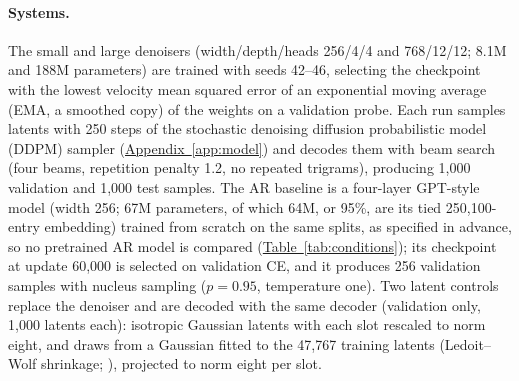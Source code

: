 \documentclass[11pt,a4paper]{article}
\begin{document}
\paragraph{Systems.} The small and large denoisers (width/depth/heads 256/4/4 and 768/12/12; 8.1M and 188M parameters) are trained with seeds 42--46, selecting the checkpoint with the lowest velocity mean squared error of an exponential moving average (EMA, a smoothed copy) of the weights on a validation probe. Each run samples latents with 250 steps of the stochastic denoising diffusion probabilistic model (DDPM) sampler \citep{ho2020denoising} (\hyperref[app:model]{Appendix~\ref*{app:model}}) and decodes them with beam search (four beams, repetition penalty 1.2, no repeated trigrams), producing 1,000 validation and 1,000 test samples. The AR baseline is a four-layer GPT-style model (width 256; 67M parameters, of which 64M, or 95\%, are its tied 250,100-entry embedding) trained from scratch on the same splits, as specified in advance, so no pretrained AR model is compared (\hyperref[tab:conditions]{Table~\ref*{tab:conditions}}); its checkpoint at update 60,000 is selected on validation CE, and it produces 256 validation samples with nucleus sampling ($p=0.95$, temperature one). Two latent controls replace the denoiser and are decoded with the same decoder (validation only, 1,000 latents each): isotropic Gaussian latents with each slot rescaled to norm eight, and draws from a Gaussian fitted to the 47,767 training latents (Ledoit--Wolf shrinkage; \citealp{ledoit2004well}), projected to norm eight per slot.
\end{document}
